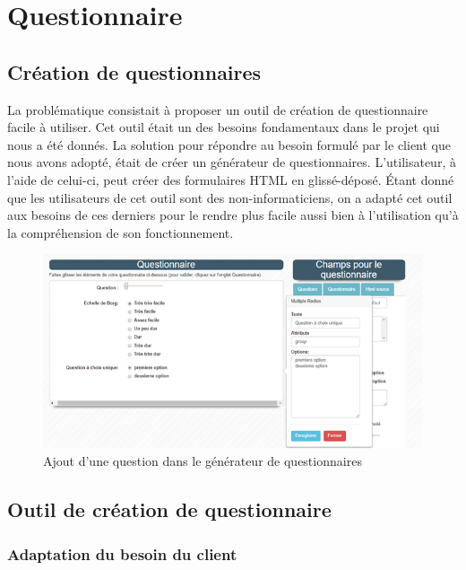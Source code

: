 \section{Questionnaire}

\subsection{Création de questionnaires}
La problématique consistait à proposer un outil de création de questionnaire facile à
utiliser. Cet outil était un des besoins fondamentaux dans le projet qui nous a été 
donnés. La solution pour répondre au besoin formulé par le client que nous avons adopté, était de créer un générateur de questionnaires. L’utilisateur, à l'aide de celui-ci, peut créer des formulaires HTML en glissé-déposé. Étant donné que les utilisateurs de cet outil sont des non-informaticiens, on a adapté cet outil aux besoins de ces derniers pour le rendre plus facile aussi bien à l’utilisation qu'à la compréhension de son fonctionnement.

\begin{figure}[H]
    \begin{center}
	\includegraphics[scale=0.8]{img/questionnaire/modification}
    \end{center}
    \caption{Ajout d'une question dans le générateur de questionnaires}
\end{figure}


\subsection{Outil de création de questionnaire}
\subsubsection{Adaptation du besoin du client}


